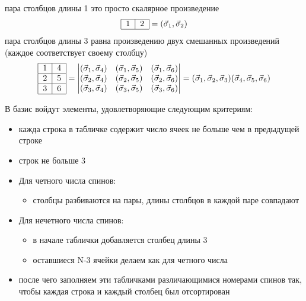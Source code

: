 \documentclass[]{article}
\begin{document}
пара столбцов длины 1 это просто скалярное произведение
$$\begin{tabular}{ |l|l| }
\hline
1 & 2 \\
\hline
\end{tabular}
= (\vec \sigma_1, \vec \sigma_2)
$$
пара столбцов длины 3 равна произведению двух смешанных произведений (каждое соответствует  своему столбцу)
$$ \begin{tabular}{ |l|l| }
\hline
1 & 4 \\ \hline
2 & 5\\ \hline
3 & 6\\
\hline
\end{tabular}
= 
\begin{vmatrix}
(\vec\sigma_1,\vec\sigma_4) & (\vec\sigma_1,\vec\sigma_5) & (\vec\sigma_1,\vec\sigma_6) \\
(\vec\sigma_2,\vec\sigma_4) & (\vec\sigma_2,\vec\sigma_5) & (\vec\sigma_2,\vec\sigma_6) \\
(\vec\sigma_3,\vec\sigma_4) & (\vec\sigma_3,\vec\sigma_5) & (\vec\sigma_3,\vec\sigma_6) \\
\end{vmatrix}
=
(\vec \sigma_1, \vec \sigma_2, \vec \sigma_3)
(\vec \sigma_4, \vec \sigma_5, \vec \sigma_6)
$$

В базис войдут элементы, удовлетворяющие следующим критериям:
\begin{itemize}
	\item кажда строка в табличке содержит число ячеек не больше чем в предыдущей строке
	\item строк не больше 3
	\item Для четного числа спинов:
	\begin{itemize}
		\item столбцы разбиваются на пары, длины столбцов в каждой паре совпадают
	\end{itemize}
	\item Для нечетного числа спинов:
	\begin{itemize}
		\item в начале таблички добавляется столбец длины 3
		\item оставшиеся N-3 ячейки делаем как для четного числа
	\end{itemize}
	\item после чего заполняем эти табличками различающимися номерами спинов так, чтобы каждая строка и каждый столбец был отсортирован
\end{itemize}
\end{document}

